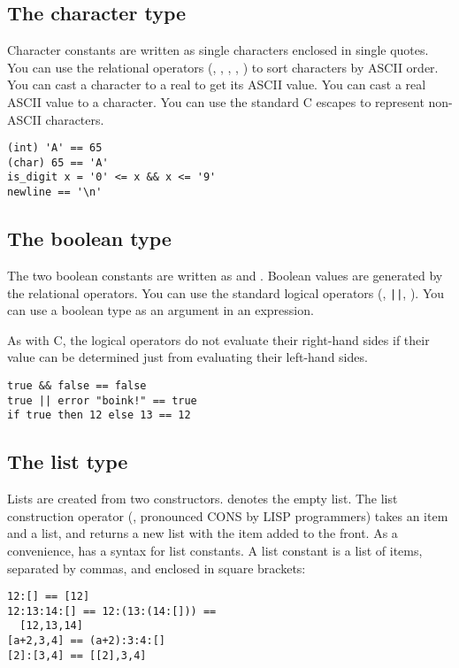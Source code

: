 \subsection{The character type}

Character constants are written as single characters enclosed in single
quotes. You can use the relational operators (\ct{<}, \ct{<=}, \ct{>},
\ct{>=}, \ct{==}) to sort characters by ASCII order. You can cast a
character to a real to get its ASCII value. You can cast a real ASCII value 
to a character. You can use the standard C escapes to represent non-ASCII
characters.

\begin{verbatim}
(int) 'A' == 65
(char) 65 == 'A'
is_digit x = '0' <= x && x <= '9'
newline == '\n' 
\end{verbatim}

\subsection{The boolean type}

The two boolean constants are written as  and . Boolean
values are generated by the relational operators.  You can use the standard
logical operators (\ct{\&\&}, \verb+||+, \ct{!}). You can use a boolean type
as an argument in an  expression.

As with C, the logical operators do not evaluate their right-hand sides if
their value can be determined just from evaluating their left-hand sides.

\begin{verbatim}
true && false == false
true || error "boink!" == true
if true then 12 else 13 == 12
\end{verbatim}

\subsection{The list type}

Lists are created from two constructors. \ct{[]} denotes the empty list. The
list construction operator (\ct{:}, pronounced CONS by LISP programmers) takes
an item and a list, and returns a new list with the item added to the front.
As a convenience, \nip{} has a syntax for list constants. A list constant is a
list of items, separated by commas, and enclosed in square brackets:

\begin{verbatim}
12:[] == [12]
12:13:14:[] == 12:(13:(14:[])) == 
  [12,13,14]
[a+2,3,4] == (a+2):3:4:[]
[2]:[3,4] == [[2],3,4]
\end{verbatim}

